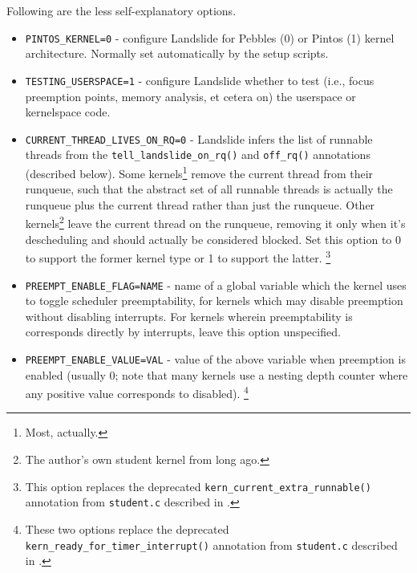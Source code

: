 Following are the less self-explanatory options.
\begin{itemize}
	\item {\tt PINTOS\_KERNEL=0} - configure Landslide for Pebbles (0) or Pintos (1) kernel architecture. Normally set automatically by the setup scripts.
	\item {\tt TESTING\_USERSPACE=1} - configure Landslide whether to test (i.e., focus preemption points, memory analysis, et cetera on) the userspace or kernelspace code.
	\item {\tt CURRENT\_THREAD\_LIVES\_ON\_RQ=0} - Landslide infers the list of runnable threads from the {\tt tell\_landslide\_on\_rq()} and {\tt off\_rq()} annotations (described below).
		Some kernels\footnote{Most, actually.} remove the current thread from their runqueue,
		such that the abstract set of all runnable threads is actually the runqueue plus the current thread rather than just the runqueue.
		Other kernels\footnote{The author's own student kernel from long ago.}
		leave the current thread on the runqueue,
		removing it only when it's descheduling and should actually be considered blocked.
		Set this option to 0 to support the former kernel type or 1 to support the latter.%
		\footnote{This option replaces the deprecated {\tt kern\_current\_extra\_runnable()} annotation from {\tt student.c} described in \cite[\S{}6.2.3]{landslide}.}
	\item {\tt PREEMPT\_ENABLE\_FLAG=NAME} - name of a global variable which the kernel uses to toggle scheduler preemptability, for kernels which may disable preemption without disabling interrupts.
		For kernels wherein preemptability is corresponds directly by interrupts, leave this option unspecified.
	\item {\tt PREEMPT\_ENABLE\_VALUE=VAL} - value of the above variable when preemption is enabled
		(usually 0; note that many kernels use a nesting depth counter where any positive value corresponds to disabled).%
		\footnote{These two options replace the deprecated {\tt kern\_ready\_for\_timer\_interrupt()} annotation from {\tt student.c} described in \cite{landslide} .}

\end{itemize}
